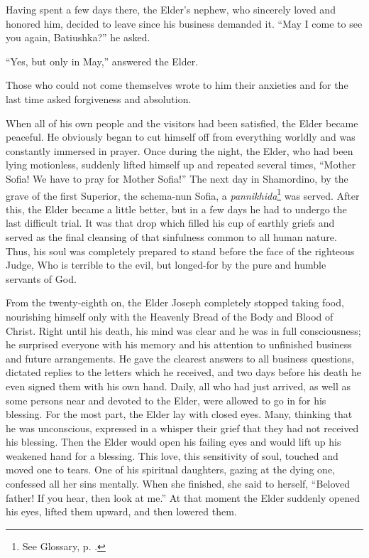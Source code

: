 Having spent a few days there, the Elder's nephew, who sincerely loved and honored him, decided to leave since his business demanded it. ``May I come to see you again, Batiushka?'' he asked.

``Yes, but only in May,'' answered the Elder.

Those who could not come themselves wrote to him their anxieties and for the last time asked forgiveness and absolution.

When all of his own people and the visitors had been satisfied, the Elder became peaceful. He obviously began to cut himself off from everything worldly and was constantly immersed in prayer. Once during the night, the Elder, who had been lying motionless, suddenly lifted himself up and repeated several times, ``Mother Sofia! We have to pray for Mother Sofia!'' The next day in Shamordino, by the grave of the first Superior, the schema-nun Sofia, a \textit{pannikhida}\footnote{See Glossary, p. \pageref{pannikhida}.} was served. After this, the Elder became a little better, but in a few days he had to undergo the last difficult trial. It was that drop which filled his cup of earthly griefs and served as the final cleansing of that sinfulness common to all human nature. Thus, his soul was completely prepared to stand before the face of the righteous Judge, Who is terrible to the evil, but longed-for by the pure and humble servants of God.

From the twenty-eighth on, the Elder Joseph completely stopped taking food, nourishing himself only with the Heavenly Bread of the Body and Blood of Christ. Right until his death, his mind was clear and he was in full consciousness; he surprised everyone with his memory and his attention to unfinished business and future arrangements. He gave the clearest answers to all business questions, dictated replies to the letters which he received, and two days before his death he even signed them with his own hand. Daily, all who had just arrived, as well as some persons near and devoted to the Elder, were allowed to go in for his blessing. For the most part, the Elder lay with closed eyes. Many, thinking that he was unconscious, expressed in a whisper their grief that they had not received his blessing. Then the Elder would open his failing eyes and would lift up his weakened hand for a blessing. This love, this sensitivity of soul, touched and moved one to tears. One of his spiritual daughters, gazing at the dying one, confessed all her sins mentally. When she finished, she said to herself, ``Beloved father! If you hear, then look at me.'' At that moment the Elder suddenly opened his eyes, lifted them upward, and then lowered them.

